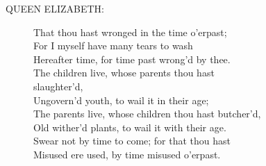 \documentclass{article}
\begin{document}
\begin{description}
\item[QUEEN ELIZABETH:] 
\hspace{1pt}That thou hast wronged in the time o'erpast;\\
\hspace{1pt}For I myself have many tears to wash\\
\hspace{1pt}Hereafter time, for time past wrong'd by thee.\\
\hspace{1pt}The children live, whose parents thou hast\\
\hspace{1pt}slaughter'd,\\
\hspace{1pt}Ungovern'd youth, to wail it in their age;\\
\hspace{1pt}The parents live, whose children thou hast butcher'd,\\
\hspace{1pt}Old wither'd plants, to wail it with their age.\\
\hspace{1pt}Swear not by time to come; for that thou hast\\
\hspace{1pt}Misused ere used, by time misused o'erpast.\\
\end{description}
\end{document}
